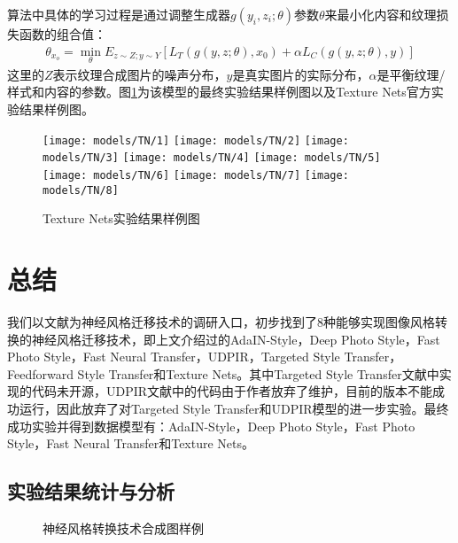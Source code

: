 算法中具体的学习过程是通过调整生成器$g(y_i,z_i;\theta)$参数$\theta$来最小化内容和纹理损失函数的组合值：
\begin{align}
    \theta_{x_o}=\min_{\theta}E_{z\sim Z;y\sim Y}[L_T(g(y,z;\theta),x_0)+\alpha L_C(g(y,z;\theta),y)]
\end{align}
这里的$Z$表示纹理合成图片的噪声分布，$y$是真实图片的实际分布，$\alpha$是平衡纹理/样式和内容的参数。图\ref{tn-example}为该模型的最终实验结果样例图以及Texture Nets官方实验结果样例图。

\begin{figure}[ht]
    \centering
    \texttt{[image: models/TN/1]}
    \texttt{[image: models/TN/2]}
    \texttt{[image: models/TN/3]}
    \texttt{[image: models/TN/4]}
    \texttt{[image: models/TN/5]}
    \texttt{[image: models/TN/6]}
    \texttt{[image: models/TN/7]}
    \texttt{[image: models/TN/8]}
    \caption{Texture Nets实验结果样例图} 
    \label{tn-example}
\end{figure}

\section{总结}

我们以文献\cite{nst-survey}为神经风格迁移技术的调研入口，初步找到了8种能够实现图像风格转换的神经风格迁移技术，即上文介绍过的AdaIN-Style，Deep Photo Style，Fast Photo Style，Fast Neural Transfer，UDPIR，Targeted Style Transfer，Feedforward Style Transfer和Texture Nets。其中Targeted Style Transfer文献\cite{Targeted-Style-Transfer}中实现的代码未开源，UDPIR文献\cite{UDPIR}中的代码由于作者放弃了维护，目前的版本不能成功运行，因此放弃了对Targeted Style Transfer和UDPIR模型的进一步实验。最终成功实验并得到数据模型有：AdaIN-Style，Deep Photo Style，Fast Photo Style，Fast Neural Transfer和Texture Nets。

\subsection{实验结果统计与分析}

\begin{figure}[h]
    \centering
    \caption{神经风格转换技术合成图样例}
    \label{fps:sam}
\end{figure}

